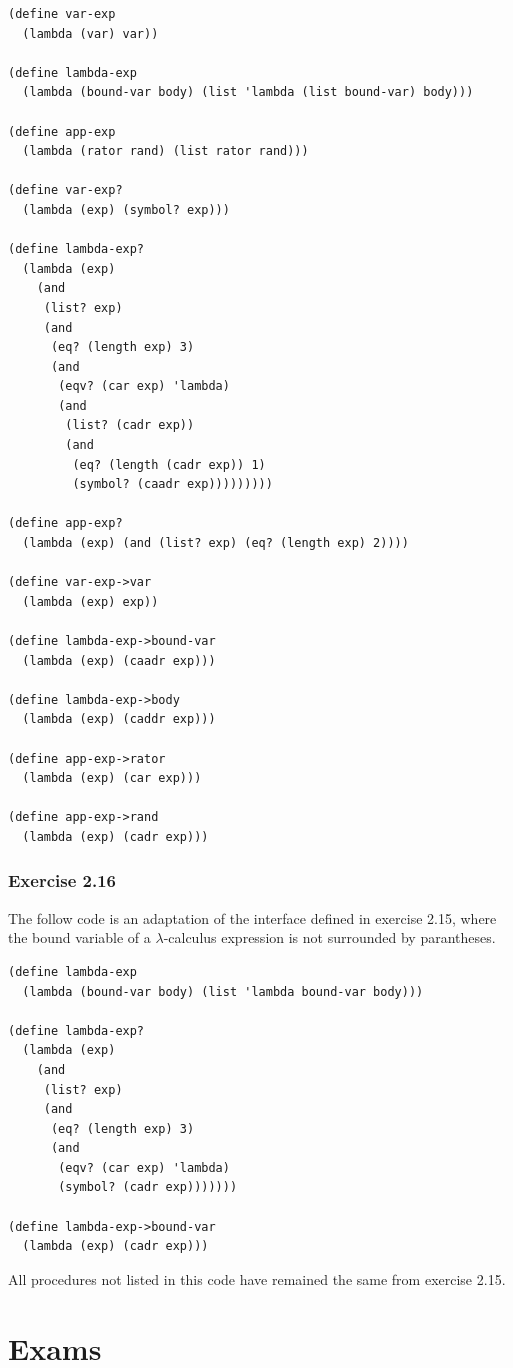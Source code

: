 \documentclass[a4paper]{article}
\begin{document}
\begin{lstlisting}
(define var-exp
  (lambda (var) var))

(define lambda-exp
  (lambda (bound-var body) (list 'lambda (list bound-var) body)))
   
(define app-exp
  (lambda (rator rand) (list rator rand)))
  
(define var-exp?
  (lambda (exp) (symbol? exp)))
  
(define lambda-exp?
  (lambda (exp)
    (and 
     (list? exp) 
     (and
      (eq? (length exp) 3)
      (and
       (eqv? (car exp) 'lambda)
       (and
        (list? (cadr exp))
        (and
         (eq? (length (cadr exp)) 1)
         (symbol? (caadr exp)))))))))

(define app-exp?
  (lambda (exp) (and (list? exp) (eq? (length exp) 2))))

(define var-exp->var
  (lambda (exp) exp))

(define lambda-exp->bound-var
  (lambda (exp) (caadr exp)))

(define lambda-exp->body
  (lambda (exp) (caddr exp)))

(define app-exp->rator
  (lambda (exp) (car exp)))

(define app-exp->rand
  (lambda (exp) (cadr exp)))
\end{lstlisting}

\subsubsection{Exercise 2.16}

The follow code is an adaptation of the interface defined in exercise 2.15, where the bound variable of a $\lambda$-calculus expression is not surrounded by parantheses.

\begin{lstlisting}
(define lambda-exp
  (lambda (bound-var body) (list 'lambda bound-var body)))
  
(define lambda-exp?
  (lambda (exp)
    (and 
     (list? exp) 
     (and
      (eq? (length exp) 3)
      (and
       (eqv? (car exp) 'lambda)
       (symbol? (cadr exp)))))))

(define lambda-exp->bound-var
  (lambda (exp) (cadr exp)))
\end{lstlisting}

All procedures not listed in this code have remained the same from exercise 2.15.

\newpage

\section{Exams}
\end{document}
